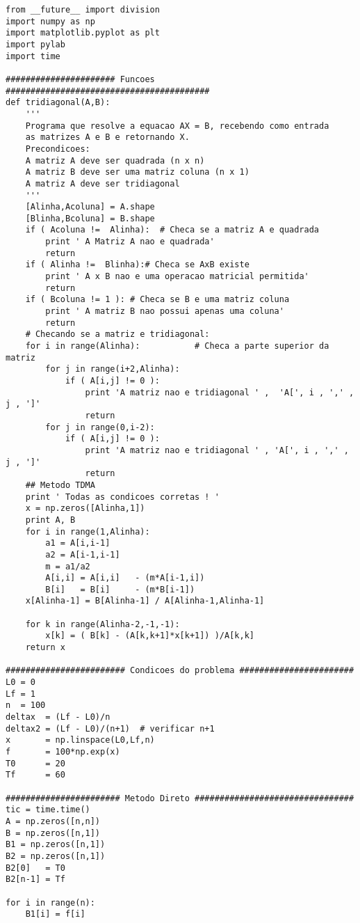 \lstset{language=Python}
\begin{lstlisting}
from __future__ import division
import numpy as np
import matplotlib.pyplot as plt
import pylab
import time

###################### Funcoes #########################################
def tridiagonal(A,B):
    '''
    Programa que resolve a equacao AX = B, recebendo como entrada
    as matrizes A e B e retornando X.
    Precondicoes: 
    A matriz A deve ser quadrada (n x n)
    A matriz B deve ser uma matriz coluna (n x 1)
    A matriz A deve ser tridiagonal
    '''
    [Alinha,Acoluna] = A.shape
    [Blinha,Bcoluna] = B.shape
    if ( Acoluna !=  Alinha):  # Checa se a matriz A e quadrada
        print ' A Matriz A nao e quadrada'
        return
    if ( Alinha !=  Blinha):# Checa se AxB existe
        print ' A x B nao e uma operacao matricial permitida'
        return
    if ( Bcoluna != 1 ): # Checa se B e uma matriz coluna
        print ' A matriz B nao possui apenas uma coluna'
        return    
    # Checando se a matriz e tridiagonal:
    for i in range(Alinha):           # Checa a parte superior da matriz
        for j in range(i+2,Alinha):
            if ( A[i,j] != 0 ):
                print 'A matriz nao e tridiagonal ' ,  'A[', i , ',' , j , ']'
                return
        for j in range(0,i-2):
            if ( A[i,j] != 0 ):
                print 'A matriz nao e tridiagonal ' , 'A[', i , ',' , j , ']'
                return       
    ## Metodo TDMA
    print ' Todas as condicoes corretas ! '
    x = np.zeros([Alinha,1])
    print A, B
    for i in range(1,Alinha):
        a1 = A[i,i-1]
        a2 = A[i-1,i-1]
        m = a1/a2
        A[i,i] = A[i,i]   - (m*A[i-1,i])
        B[i]   = B[i]     - (m*B[i-1])
    x[Alinha-1] = B[Alinha-1] / A[Alinha-1,Alinha-1]
    
    for k in range(Alinha-2,-1,-1):
        x[k] = ( B[k] - (A[k,k+1]*x[k+1]) )/A[k,k]
    return x

######################## Condicoes do problema #######################
L0 = 0
Lf = 1
n  = 100
deltax  = (Lf - L0)/n
deltax2 = (Lf - L0)/(n+1)  # verificar n+1
x       = np.linspace(L0,Lf,n)
f       = 100*np.exp(x)
T0      = 20
Tf      = 60

####################### Metodo Direto ################################
tic = time.time()
A = np.zeros([n,n])
B = np.zeros([n,1])
B1 = np.zeros([n,1])
B2 = np.zeros([n,1])
B2[0]   = T0
B2[n-1] = Tf

for i in range(n):
    B1[i] = f[i]


\end{lstlisting}
